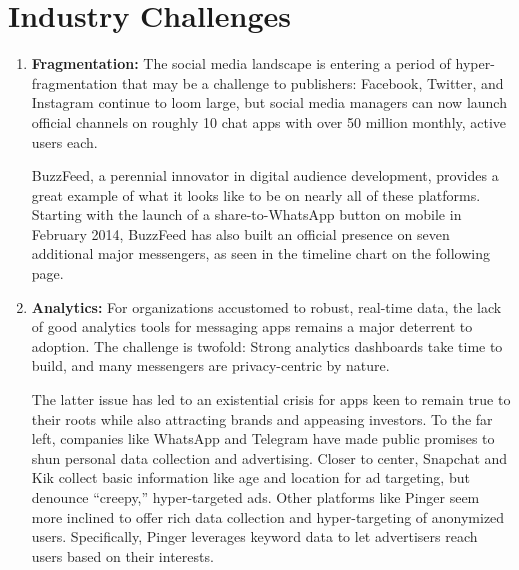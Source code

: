 \documentclass[notoc, symmetric, nobib, nols]{towcenter-guideto-book}
\begin{document}
\section{Industry Challenges}

\begin{enumerate}[itemsep=1em]
\item\textbf{Fragmentation:} The social media landscape is entering a period of hyper-fragmentation that may be a challenge to publishers: Facebook, Twitter, and Instagram continue to loom large, but social media managers can now launch official channels on roughly 10 chat apps with over 50 million monthly, active users each.  

\hspace{2ex} BuzzFeed, a perennial innovator in digital audience development, provides a great example of what it looks like to be on nearly all of these platforms. Starting with the launch of a share-to-WhatsApp button on mobile in February 2014, BuzzFeed has also built an official presence on seven additional major messengers, as seen in the timeline chart on the following page.


\item\textbf{Analytics:} For organizations accustomed to robust, real-time data, the lack of good analytics tools for messaging apps remains a major deterrent to adoption. The challenge is twofold: Strong analytics dashboards take time to build, and many messengers are privacy-centric by nature.  

\hspace{2ex} The latter issue has led to an existential crisis for apps keen to remain true to their roots while also attracting brands and appeasing investors. To the far left, companies like WhatsApp and Telegram have made public promises to shun personal data collection and advertising. Closer to center, Snapchat and Kik collect basic information like age and location for ad targeting, but denounce ``creepy,'' hyper-targeted ads. Other platforms like Pinger seem more inclined to offer rich data collection and hyper-targeting of anonymized users. Specifically, Pinger leverages keyword data to let advertisers reach users based on their interests.  



\end{enumerate}
\end{document}
